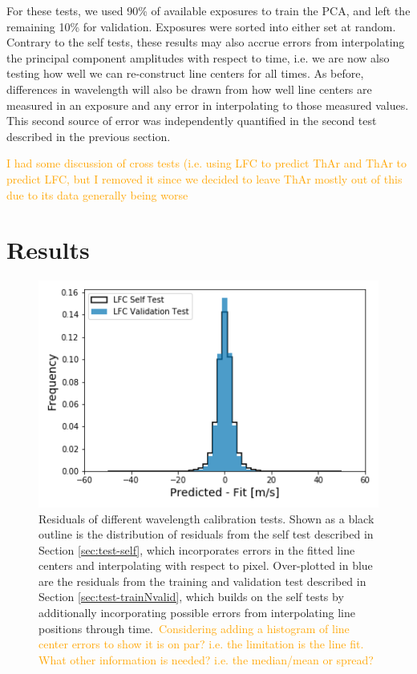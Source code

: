 \documentclass[12pt, letterpaper]{article}
\newcommand{\lz}[1]{\textcolor{orange}{#1}}
\begin{document}
For these tests, we used 90\% of available exposures to train the PCA, and left the remaining 10\% for validation.  Exposures were sorted into either set at random.  Contrary to the self tests, these results may also accrue errors from interpolating the principal component amplitudes with respect to time, i.e. we are now also testing how well we can re-construct line centers for all times.   As before, differences in wavelength will also be drawn from how well line centers are measured in an exposure and any error in interpolating to those measured values.  This second source of error was independently quantified in the second test described in the previous section.

\lz{I had some discussion of cross tests (i.e. using LFC to predict ThAr and ThAr to predict LFC, but I removed it since we decided to leave ThAr mostly out of this due to its data generally being worse}

\section{Results} \label{sec:results}

\begin{figure}[h]
\centering
\includegraphics[width=.5\textwidth]{Figures/lfcgood.png}
\caption{Residuals of different wavelength calibration tests.  Shown as a black outline is the distribution of residuals from the self test described in Section \ref{sec:test-self}, which incorporates errors in the fitted line centers and interpolating with respect to pixel.  Over-plotted in blue are the residuals from the training and validation test described in Section \ref{sec:test-trainNvalid}, which builds on the self tests by additionally incorporating possible errors from interpolating line positions through time.\
\lz{Considering adding a histogram of line center errors to show it is on par?  i.e. the limitation is the line fit.  What other information is needed?  i.e. the median/mean or spread?}}
\label{fig:testHists}
\end{figure} 
\end{document}
